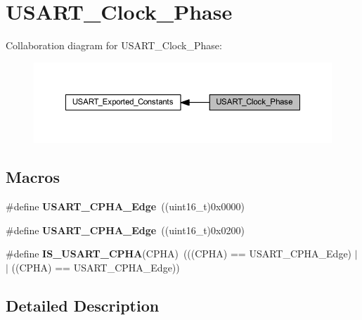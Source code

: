 \hypertarget{group___u_s_a_r_t___clock___phase}{}\section{U\+S\+A\+R\+T\+\_\+\+Clock\+\_\+\+Phase}
\label{group___u_s_a_r_t___clock___phase}
Collaboration diagram for U\+S\+A\+R\+T\+\_\+\+Clock\+\_\+\+Phase\+:
\nopagebreak
\begin{figure}[H]
\begin{center}
\leavevmode
\includegraphics[width=350pt]{group___u_s_a_r_t___clock___phase}
\end{center}
\end{figure}
\subsection*{Macros}
\begin{DoxyCompactItemize}
\item 
\mbox{\label{group___u_s_a_r_t___clock___phase_gab6c0fb052fb9bc418cf368c1a0e4643b}} 
\#define {\bfseries U\+S\+A\+R\+T\+\_\+\+C\+P\+H\+A\+\_\+Edge}~((uint16\+\_\+t)0x0000)
\item 
\mbox{\label{group___u_s_a_r_t___clock___phase_ga66344d0725f1300e9d0f8f1708111f25}} 
\#define {\bfseries U\+S\+A\+R\+T\+\_\+\+C\+P\+H\+A\+\_\+Edge}~((uint16\+\_\+t)0x0200)
\item 
\mbox{\label{group___u_s_a_r_t___clock___phase_ga66fa1a3a757025fcd8dd069a90689f88}} 
\#define {\bfseries I\+S\+\_\+\+U\+S\+A\+R\+T\+\_\+\+C\+P\+HA}(C\+P\+HA)~(((C\+P\+HA) == U\+S\+A\+R\+T\+\_\+\+C\+P\+H\+A\+\_\+Edge) $\vert$$\vert$ ((C\+P\+HA) == U\+S\+A\+R\+T\+\_\+\+C\+P\+H\+A\+\_\+Edge))
\end{DoxyCompactItemize}


\subsection{Detailed Description}
